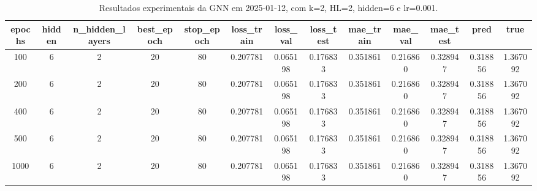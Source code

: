 \begin{table}[h]
\centering
\caption{Resultados experimentais da GNN em 2025-01-12, com k=2, HL=2, hidden=6 e lr=0.001.}
\label{tab:gnn_results_k2_hl2_h6_d20250112}
\begin{tabular}{ccccccccccccc}
\toprule
epochs & hidden & n\_hidden\_layers & best\_epoch & stop\_epoch & loss\_train & loss\_val & loss\_test & mae\_train & mae\_val & mae\_test & pred & true \\
\midrule
100 & 6 & 2 & 20 & 80 & 0.207781 & 0.065198 & 0.176833 & 0.351861 & 0.216860 & 0.328947 & 0.318856 & 1.367092 \\
200 & 6 & 2 & 20 & 80 & 0.207781 & 0.065198 & 0.176833 & 0.351861 & 0.216860 & 0.328947 & 0.318856 & 1.367092 \\
400 & 6 & 2 & 20 & 80 & 0.207781 & 0.065198 & 0.176833 & 0.351861 & 0.216860 & 0.328947 & 0.318856 & 1.367092 \\
500 & 6 & 2 & 20 & 80 & 0.207781 & 0.065198 & 0.176833 & 0.351861 & 0.216860 & 0.328947 & 0.318856 & 1.367092 \\
1000 & 6 & 2 & 20 & 80 & 0.207781 & 0.065198 & 0.176833 & 0.351861 & 0.216860 & 0.328947 & 0.318856 & 1.367092 \\
\bottomrule
\end{tabular}
\end{table}
